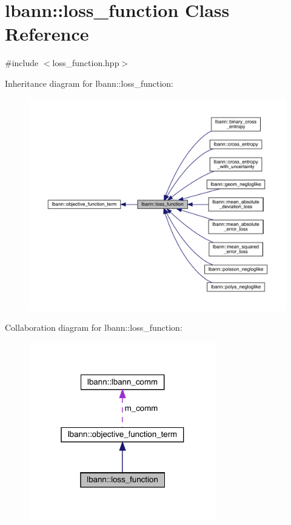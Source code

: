 \hypertarget{classlbann_1_1loss__function}{}\section{lbann\+:\+:loss\+\_\+function Class Reference}
\label{classlbann_1_1loss__function}


{\ttfamily \#include $<$loss\+\_\+function.\+hpp$>$}



Inheritance diagram for lbann\+:\+:loss\+\_\+function\+:\nopagebreak
\begin{figure}[H]
\begin{center}
\leavevmode
\includegraphics[width=350pt]{classlbann_1_1loss__function__inherit__graph}
\end{center}
\end{figure}


Collaboration diagram for lbann\+:\+:loss\+\_\+function\+:\nopagebreak
\begin{figure}[H]
\begin{center}
\leavevmode
\includegraphics[width=232pt]{classlbann_1_1loss__function__coll__graph}
\end{center}
\end{figure}
